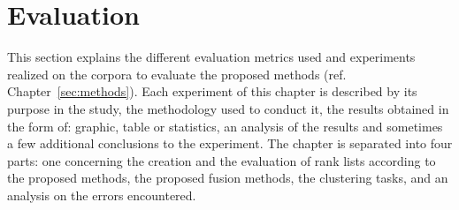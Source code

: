 \section{Evaluation \label{sec:evaluation}}

This section explains the different evaluation metrics used and experiments realized on the corpora to evaluate the proposed methods (ref. Chapter~\ref{sec:methods}).
Each experiment of this chapter is described by its purpose in the study, the methodology used to conduct it, the results obtained in the form of: graphic, table or statistics, an analysis of the results and sometimes a few additional conclusions to the experiment.
The chapter is separated into four parts: one concerning the creation and the evaluation of rank lists according to the proposed methods, the proposed fusion methods, the clustering tasks, and an analysis on the errors encountered.







